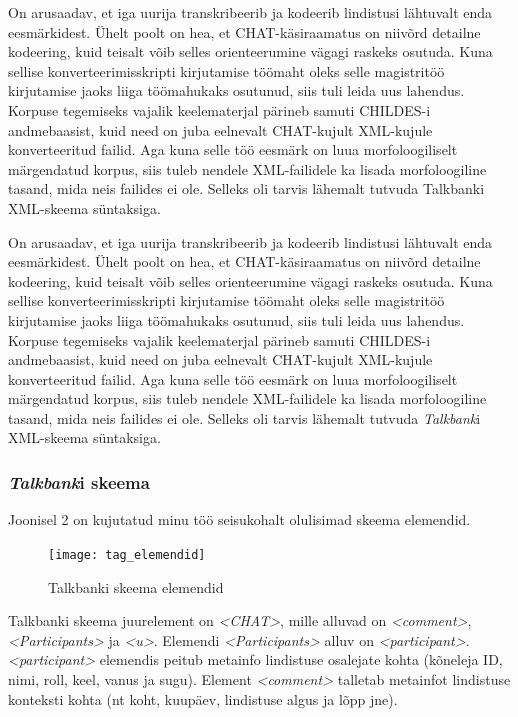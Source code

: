 \documentclass[12pt]{article}
\begin{document}
On arusaadav, et iga uurija transkribeerib ja kodeerib lindistusi lähtuvalt enda eesmärkidest. Ühelt poolt on hea, et CHAT-käsiraamatus on niivõrd detailne kodeering, kuid teisalt võib selles orienteerumine vägagi raskeks osutuda. Kuna sellise konverteerimisskripti kirjutamise töömaht oleks selle magistritöö kirjutamise jaoks liiga töömahukaks osutunud, siis tuli leida uus lahendus. Korpuse tegemiseks vajalik keelematerjal pärineb samuti CHILDES-i andmebaasist, kuid need on juba eelnevalt CHAT-kujult XML-kujule konverteeritud failid. Aga kuna selle töö eesmärk on luua morfoloogiliselt märgendatud korpus, siis tuleb nendele XML-failidele ka lisada morfoloogiline tasand, mida neis failides ei ole. Selleks oli tarvis lähemalt tutvuda Talkbanki XML-skeema süntaksiga.


On arusaadav, et iga uurija transkribeerib ja kodeerib lindistusi lähtuvalt enda eesmärkidest. Ühelt poolt on hea, et CHAT-käsiraamatus on niivõrd detailne kodeering, kuid teisalt võib selles orienteerumine vägagi raskeks osutuda. Kuna sellise konverteerimisskripti kirjutamise töömaht oleks selle magistritöö kirjutamise jaoks liiga töömahukaks osutunud, siis tuli leida uus lahendus. Korpuse tegemiseks vajalik keelematerjal pärineb samuti CHILDES-i andmebaasist, kuid need on juba eelnevalt CHAT-kujult XML-kujule konverteeritud failid. Aga kuna selle töö eesmärk on luua morfoloogiliselt märgendatud korpus, siis tuleb nendele XML-failidele ka lisada morfoloogiline tasand, mida neis failides ei ole. Selleks oli tarvis lähemalt tutvuda \emph{Talkbank}i XML-skeema süntaksiga.

\subsubsection{\emph{Talkbank}i skeema}

Joonisel 2 on kujutatud minu töö seisukohalt olulisimad skeema elemendid.

\begin{figure}[H]
    \centering
    \texttt{[image: tag\_elemendid]}
    \caption{Talkbanki skeema elemendid}
\end{figure}

Talkbanki skeema juurelement on \emph{<CHAT>}, mille alluvad on \emph{<comment>}, \emph{<Participants>} ja \emph{<u>}. Elemendi \emph{<Participants>} alluv on \emph{<participant>}. \emph{<participant>} elemendis peitub metainfo lindistuse osalejate kohta (kõneleja ID, nimi, roll, keel, vanus ja sugu). Element \emph{<comment>} talletab metainfot lindistuse konteksti kohta (nt koht, kuupäev, lindistuse algus ja lõpp jne).
\end{document}
